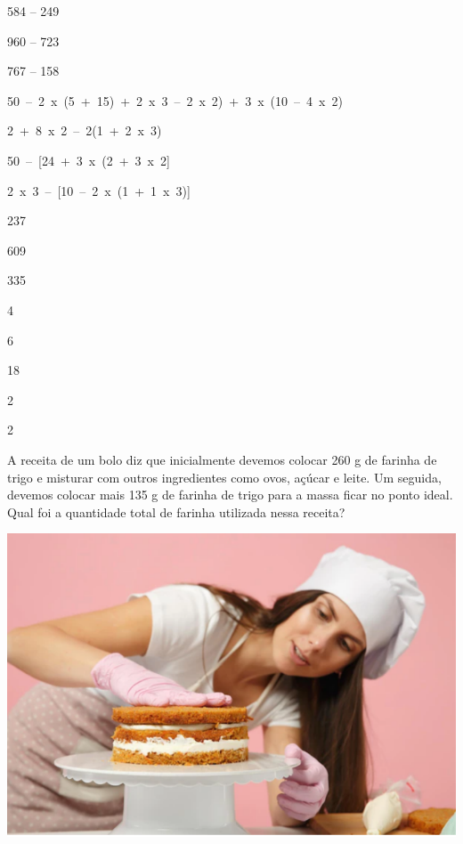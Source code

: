 {\setlength{\columnsep}{6cm}
\begin{multicols}{2}
584 – 249 

960 – 723 

767 – 158 

\mbox{50 – 2 x (5 + 15) + 2 x 3 – 2 x 2) + 3 x (10 – 4 x 2) }

\mbox{2 + 8 x 2 – 2(1 + 2 x 3) }

\mbox{50 – {[}24 + 3 x (2 + 3 x 2{]} }

\mbox{2 x 3 – {[}10 – 2 x (1 + 1 x 3){]} }

\columnbreak


237

609

335

4

6

18

2
\end{multicols}
}


\num{2}

\begin{minipage}{.5\textwidth}
A receita de um bolo diz que inicialmente devemos colocar 260 g de
farinha de trigo e misturar com outros ingredientes como ovos, açúcar e
leite. Um seguida, devemos colocar mais 135 g de farinha de trigo para a
massa ficar no ponto ideal. Qual foi a quantidade total de farinha
utilizada nessa receita?
\end{minipage}\hspace{.5cm}
\begin{minipage}{.5\textwidth}
\includegraphics[width=\textwidth]{./imgs/mat2.png}
\end{minipage}


